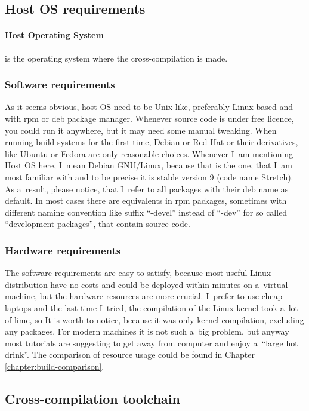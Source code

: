 \documentclass[printmode]{mgr}
\begin{document}
\subsection{Host OS requirements}

\paragraph{Host Operating System} is the operating system where the cross-compilation is made.

\subsubsection{Software requirements}
As it seems obvious, host OS need to be Unix-like, preferably Linux-based and with rpm or deb package manager. Whenever source code is under free licence, you could run it anywhere, but it may need some manual tweaking. When running build systems for the first time, Debian or Red Hat or their derivatives, like Ubuntu or Fedora are only reasonable choices. Whenever I~am mentioning Host OS here, I~mean Debian GNU/Linux, because that is the one, that I~am most familiar with and to be precise it is stable version 9 (code name Stretch). As a~result, please notice, that I~refer to all packages with their deb name as default. In most cases there are equivalents in rpm packages, sometimes with different naming convention like suffix ``-devel'' instead of ``-dev'' for so called ``development packages'', that contain source code.

\subsubsection{Hardware requirements}
The software requirements are easy to satisfy, because most useful Linux distribution have no costs and could be deployed within minutes on a~virtual machine, but the hardware resources are more crucial. I~prefer to use cheap laptops and the last time I~tried, the compilation of the Linux kernel took a~lot of lime, so It is worth to notice, because it was only kernel compilation, excluding any packages. For modern machines it is not such a~big problem, but anyway most tutorials are suggesting to get away from computer and enjoy a~``large hot drink''. The comparison of resource usage could be found in Chapter \ref{chapter:build-comparison}.

\subsection{Cross-compilation toolchain}
\end{document}
